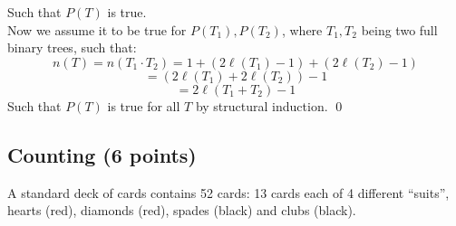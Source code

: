 \documentclass[12pt]{article}
\begin{document}
\begin{enumerate}[a)]
\begin{itemize}
    Such that $P(T)$ is true. \\

    Now we assume it to be true for $P(T_1),P(T_2)$, where $T_1,T_2$  being two full binary trees, such that: \\

    $$
    n(T) = n(T_1 \cdot T_2) = 1 + (2\ell(T_1) -1) + (2\ell(T_2) -1)
    $$
    $$
    = (2\ell(T_1) + 2\ell(T_2)) - 1
    $$
    $$
    = 2\ell(T_1 + T_2) - 1
    $$
    Such that $P(T)$ is true for all $T$ by structural induction.
    \qed
    
    
  \end{itemize}

  
 \end{enumerate}

 \bigskip
 \newpage

\subsection{Counting (6 points)}
\label{sec:counting}

A standard deck of cards contains 52 cards: 13 cards each of 4
different ``suits'', hearts (red), diamonds (red), spades (black) and
clubs (black).
\end{document}
